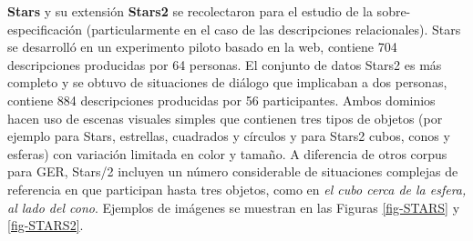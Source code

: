 \label{sec:corpusSTARS}
{\bf Stars} \cite{stars-mutual-disamb} y su extensi\'on {\bf Stars2} se recolectaron para el estudio de la sobre-especificaci\'on (particularmente en el caso de las descripciones relacionales). Stars se desarroll\'o en un experimento piloto basado en la web, contiene 704 descripciones producidas por 64 personas. El conjunto de datos Stars2 es m\'as completo y se obtuvo de situaciones de di\'alogo que implicaban a dos personas, contiene 884 descripciones producidas por 56 participantes. Ambos dominios hacen uso de escenas visuales simples que contienen tres tipos de objetos (por ejemplo para Stars, estrellas, cuadrados y c\'irculos y para Stars2 cubos, conos y esferas) con variaci\'on limitada en color y tama\~no. A diferencia de otros corpus para GER, Stars/2 incluyen un n\'umero considerable de situaciones complejas de referencia en que participan hasta tres objetos, como en {\it el cubo cerca de la esfera, al lado del cono}. Ejemplos de im\'agenes se muestran en las Figuras \ref{fig-STARS} y \ref{fig-STARS2}.

